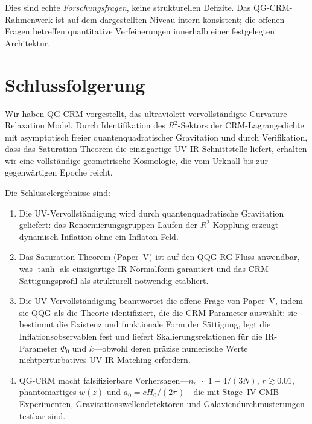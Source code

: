 \documentclass[aps,prd,twocolumn,superscriptaddress,nofootinbib]{revtex4-2}
\begin{document}
Dies sind echte \textit{Forschungsfragen}, keine strukturellen Defizite. Das QG-CRM-Rahmenwerk ist auf dem dargestellten Niveau intern konsistent; die offenen Fragen betreffen quantitative Verfeinerungen innerhalb einer festgelegten Architektur.


\section{Schlussfolgerung}
\label{sec:conclusion}

Wir haben QG-CRM vorgestellt, das ultraviolett-vervollständigte Curvature Relaxation Model. Durch Identifikation des $R^2$-Sektors der CRM-Lagrangedichte mit asymptotisch freier quantenquadratischer Gravitation und durch Verifikation, dass das Saturation Theorem die einzigartige UV-IR-Schnittstelle liefert, erhalten wir eine vollständige geometrische Kosmologie, die vom Urknall bis zur gegenwärtigen Epoche reicht.

Die Schlüsselergebnisse sind:

\begin{enumerate}
\item Die UV-Vervollständigung wird durch quantenquadratische Gravitation geliefert: das Renormierungsgruppen-Laufen der $R^2$-Kopplung erzeugt dynamisch Inflation ohne ein Inflaton-Feld.

\item Das Saturation Theorem (Paper~V) ist auf den QQG-RG-Fluss anwendbar, was $\tanh$ als einzigartige IR-Normalform garantiert und das CRM-Sättigungsprofil als strukturell notwendig etabliert.

\item Die UV-Vervollständigung beantwortet die offene Frage von Paper~V, indem sie QQG als die Theorie identifiziert, die die CRM-Parameter auswählt: sie bestimmt die Existenz und funktionale Form der Sättigung, legt die Inflationsobservablen fest und liefert Skalierungsrelationen für die IR-Parameter $\Phi_0$ und $k$---obwohl deren präzise numerische Werte nichtperturbatives UV-IR-Matching erfordern.

\item QG-CRM macht falsifizierbare Vorhersagen---$n_s \sim 1 - 4/(3N)$, $r \gtrsim 0.01$, phantomartiges $w(z)$ und $a_0 = cH_0/(2\pi)$---die mit Stage~IV CMB-Experimenten, Gravitationswellendetektoren und Galaxiendurchmusterungen testbar sind.
\end{enumerate}
\end{document}
